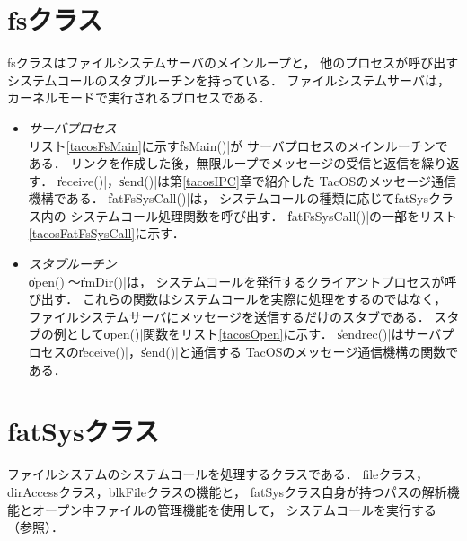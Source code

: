 \section{fsクラス}
fsクラスはファイルシステムサーバのメインループと，
他のプロセスが呼び出すシステムコールのスタブルーチンを持っている．
ファイルシステムサーバは，カーネルモードで実行されるプロセスである．

\begin{itemize}
\item \emph{サーバプロセス}\\
  リスト\ref{tacosFsMain}に示す\|fsMain()|が
  サーバプロセスのメインルーチンである．
  リンクを作成した後，無限ループでメッセージの受信と返信を繰り返す．
  \|receive()|，\|send()|は第\ref{tacosIPC}章で紹介した
  TacOSのメッセージ通信機構である．
  \|fatFsSysCall()|は，
  システムコールの種類に応じてfatSysクラス内の
  システムコール処理関数を呼び出す．
  \|fatFsSysCall()|の一部をリスト\ref{tacosFatFsSysCall}に示す．
  
  
\item \emph{スタブルーチン}\\
  \|open()|〜\|rmDir()|は，
  システムコールを発行するクライアントプロセスが呼び出す．
  これらの関数はシステムコールを実際に処理をするのではなく，
  ファイルシステムサーバにメッセージを送信するだけのスタブである．
  スタブの例として\|open()|関数をリスト\ref{tacosOpen}に示す．
  \|sendrec()|はサーバプロセスの\|receive()|，\|send()|と通信する
  TacOSのメッセージ通信機構の関数である．
  
\end{itemize}

\section{fatSysクラス}
ファイルシステムのシステムコールを処理するクラスである．
fileクラス，dirAccessクラス，blkFileクラスの機能と，
fatSysクラス自身が持つパスの解析機能とオープン中ファイルの管理機能を使用して，
システムコールを実行する（参照）．

